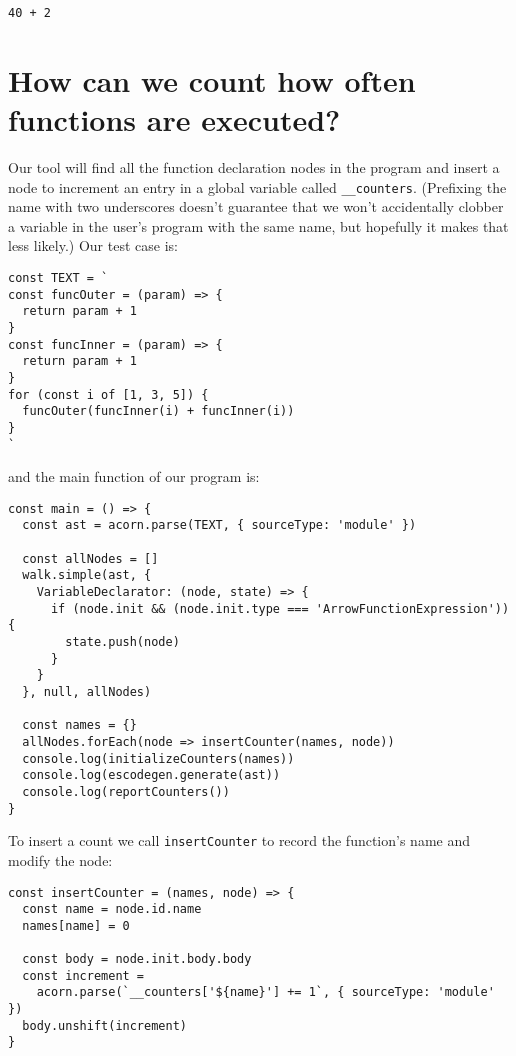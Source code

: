 \documentclass[krantzl]{krantz}
\begin{document}
\begin{lstlisting}[frame=single,frameround=tttt]
40 + 2
\end{lstlisting}


\section{How can we count how often functions are executed?}\label{code-generator-count}


Our tool will find all the function declaration nodes in the program
and insert a node to increment an entry in a global variable called \texttt{\_\_counters}.
(Prefixing the name with two underscores doesn't guarantee that
we won't accidentally clobber a variable in the user's program with the same name,
but hopefully it makes that less likely.)
Our test case is:


\begin{lstlisting}[frame=single,frameround=tttt]
const TEXT = `
const funcOuter = (param) => {
  return param + 1
}
const funcInner = (param) => {
  return param + 1
}
for (const i of [1, 3, 5]) {
  funcOuter(funcInner(i) + funcInner(i))
}
`
\end{lstlisting}



\noindent and the main function of our program is:


\begin{lstlisting}[frame=single,frameround=tttt]
const main = () => {
  const ast = acorn.parse(TEXT, { sourceType: 'module' })

  const allNodes = []
  walk.simple(ast, {
    VariableDeclarator: (node, state) => {
      if (node.init && (node.init.type === 'ArrowFunctionExpression')) {
        state.push(node)
      }
    }
  }, null, allNodes)

  const names = {}
  allNodes.forEach(node => insertCounter(names, node))
  console.log(initializeCounters(names))
  console.log(escodegen.generate(ast))
  console.log(reportCounters())
}
\end{lstlisting}



To insert a count we call \texttt{insertCounter}
to record the function's name and modify the node:


\begin{lstlisting}[frame=single,frameround=tttt]
const insertCounter = (names, node) => {
  const name = node.id.name
  names[name] = 0

  const body = node.init.body.body
  const increment =
    acorn.parse(`__counters['${name}'] += 1`, { sourceType: 'module' })
  body.unshift(increment)
}
\end{lstlisting}
\end{document}
